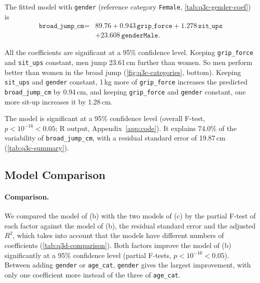 The fitted model with \texttt{gender} (reference category \texttt{Female}, \autoref{tab:q3c-gender-coef}) is
\begin{align*}
  \texttt{broad\_jump\_cm} = {}& 89.76 + 0.943\,\texttt{grip\_force} + 1.278\,\texttt{sit\_ups} \\
  & + 23.608\,\texttt{genderMale}.
\end{align*}

All the coefficients are significant at a 95\% confidence level.
Keeping \texttt{grip\_force} and \texttt{sit\_ups} constant, men jump 23.61\,cm further than women.
So men perform better than women in the broad jump (\autoref{fig:q3c-categories}, bottom).
Keeping \texttt{sit\_ups} and \texttt{gender} constant, 1\,kg more of \texttt{grip\_force} increases the predicted \texttt{broad\_jump\_cm} by 0.94\,cm, and keeping \texttt{grip\_force} and \texttt{gender} constant, one more sit-up increases it by 1.28\,cm.

The model is significant at a 95\% confidence level (overall F-test, $p < 10^{-16} < 0.05$; R output, Appendix~\ref{app:code}).
It explains 74.0\% of the variability of \texttt{broad\_jump\_cm}, with a residual standard error of 19.87\,cm (\autoref{tab:q3c-summary}).

\subsection{Model Comparison}\label{sec:q3d}


\paragraph{Comparison.}
We compared the model of (b) with the two models of (c) by the partial F-test of each factor against the model of (b), the residual standard error and the adjusted $R^2$, which takes into account that the models have different numbers of coefficients (\autoref{tab:q3d-comparison}).
Both factors improve the model of (b) significantly at a 95\% confidence level (partial F-tests, $p < 10^{-16} < 0.05$).
Between adding \texttt{gender} or \texttt{age\_cat}, \texttt{gender} gives the largest improvement, with only one coefficient more instead of the three of \texttt{age\_cat}.

